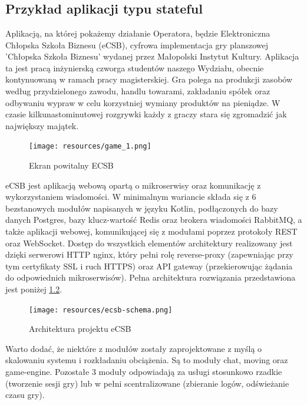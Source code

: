 \documentclass[polish]{aghengthesis}
\begin{document}
\chapter{\ChapterTitleCaseStudyDesc}
\label{sec:opis-studium-przypadku}

\section{Przykład aplikacji typu stateful}
Aplikacją, na której pokażemy działanie Operatora, będzie Elektroniczna Chłopska Szkoła Biznesu (eCSB), cyfrowa implementacja gry planszowej 'Chłopska Szkoła Biznesu' wydanej przez Małopolski Instytut Kultury. Aplikacja ta jest pracą inżynierską czworga studentów naszego Wydziału, obecnie kontynuowaną w ramach pracy magisterskiej. Gra polega na produkcji zasobów według przydzielonego zawodu, handlu towarami, zakładaniu spółek oraz odbywaniu wypraw w celu korzystniej wymiany produktów na pieniądze. W czasie kilkunastominutowej rozgrywki każdy z graczy stara się zgromadzić jak największy majątek.

\begin{figure}[!htbp]
    \centering
    \texttt{[image: resources/game\_1.png]}
    \caption{Ekran powitalny ECSB}
    \label{fig:ecsb}
\end{figure}

eCSB jest aplikacją webową opartą o mikroserwisy oraz komunikację z wykorzystaniem wiadomości. W minimalnym wariancie składa się z 6 bezstanowych modułów napisanych w języku Kotlin, podłączonych do bazy danych Postgres, bazy klucz-wartość Redis oraz brokera wiadomości RabbitMQ, a także aplikacji webowej, komunikującej się z modułami poprzez protokoły REST oraz WebSocket. Dostęp do wszystkich elementów architektury realizowany jest dzięki serwerowi HTTP nginx, który pełni rolę reverse-proxy (zapewniając przy tym certyfikaty SSL i ruch HTTPS) oraz API gateway (przekierowując żądania do odpowiednich mikroserwisów). Pełna architektura rozwiązania przedstawiona jest poniżej \ref{fig:schema}.

\begin{figure}[!htbp]
    \centering
    \texttt{[image: resources/ecsb-schema.png]}
    \caption{Architektura projektu eCSB}
    \label{fig:schema}
\end{figure}

\newpage
Warto dodać, że niektóre z modułów zostały zaprojektowane z myślą o skalowaniu systemu i rozkładaniu obciążenia. Są to moduły chat, moving oraz game-engine. Pozostałe 3 moduły odpowiadają za usługi stosunkowo rzadkie (tworzenie sesji gry) lub w pełni scentralizowane (zbieranie logów, odświeżanie czasu gry). 
\end{document}
